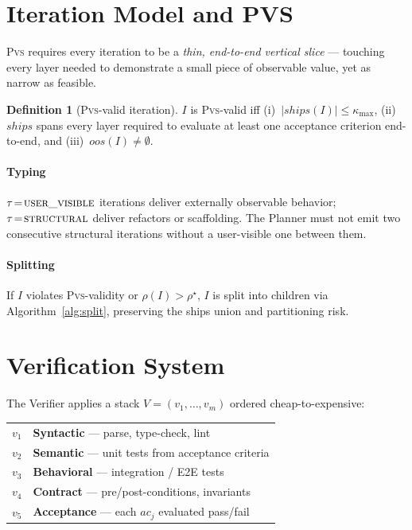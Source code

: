 \documentclass[10pt,twocolumn,letterpaper]{article}
\theoremstyle{definition}
\newtheorem{definition}{Definition}[section]
\theoremstyle{plain}
\newcommand{\PVS}{\textsc{Pvs}}
\begin{document}
\section{Iteration Model and PVS}\label{sec:iteration-model}

\PVS{} requires every iteration to be a \emph{thin, end-to-end
vertical slice} — touching every layer needed to demonstrate a small
piece of observable value, yet as narrow as feasible.

\begin{definition}[\PVS{}-valid iteration]\label{def:pvs}
$I$ is \PVS{}-valid iff
(i)~$|\mathit{ships}(I)|\leq\kappa_{\max}$,
(ii)~$\mathit{ships}$ spans every layer required to evaluate at least
one acceptance criterion end-to-end, and
(iii)~$\mathit{oos}(I)\neq\emptyset$.
\end{definition}

\paragraph{Typing}
$\tau\!=\!\textsc{user\_visible}$ iterations deliver externally
observable behavior; $\tau\!=\!\textsc{structural}$ deliver refactors
or scaffolding. The Planner must not emit two consecutive structural
iterations without a user-visible one between them.

\paragraph{Splitting}
If $I$ violates \PVS{}-validity or $\rho(I)>\rho^\star$, $I$ is split
into children via Algorithm~\ref{alg:split}, preserving the ships
union and partitioning risk.

\section{Verification System}\label{sec:verification}

The Verifier applies a stack $V=(v_1,\dots,v_m)$ ordered
cheap-to-expensive:

\smallskip\noindent
\begin{tabular}{@{}cl@{}}
$v_1$ & \textbf{Syntactic} — parse, type-check, lint \\
$v_2$ & \textbf{Semantic} — unit tests from acceptance criteria \\
$v_3$ & \textbf{Behavioral} — integration / E2E tests \\
$v_4$ & \textbf{Contract} — pre/post-conditions, invariants \\
$v_5$ & \textbf{Acceptance} — each $\mathit{ac}_j$ evaluated pass/fail \\
\end{tabular}
\smallskip
\end{document}
